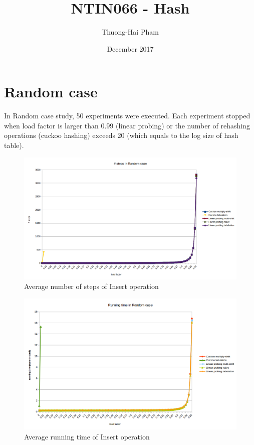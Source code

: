 \documentclass{article}
\title{NTIN066 - Hash}
\author{Thuong-Hai Pham}
\date{December 2017}
\begin{document}
\maketitle

\section{Random case}

In Random case study, 50 experiments were executed. Each experiment stopped when load factor is larger than 0.99 (linear probing) or the number of rehashing operations (cuckoo hashing) exceeds 20 (which equals to the log size of hash table).

\begin{figure}[h!]
\centering
\includegraphics[width=\textwidth]{0_steps.png}
\caption{Average number of steps of Insert operation}
\label{fig:0_steps}
\end{figure}

\begin{figure}[h!]
\centering
\includegraphics[width=\textwidth]{0_time.png}
\caption{Average running time of Insert operation}
\label{fig:0_time}
\end{figure}
\end{document}
